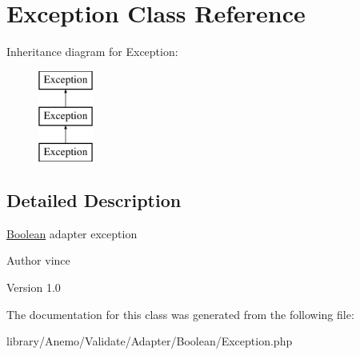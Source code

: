 \hypertarget{class_anemo_1_1_validate_1_1_adapter_1_1_boolean_1_1_exception}{
\section{Exception Class Reference}
\label{class_anemo_1_1_validate_1_1_adapter_1_1_boolean_1_1_exception}
}
Inheritance diagram for Exception:\begin{figure}[H]
\begin{center}
\leavevmode
\includegraphics[height=3.000000cm]{class_anemo_1_1_validate_1_1_adapter_1_1_boolean_1_1_exception}
\end{center}
\end{figure}


\subsection{Detailed Description}
\hyperlink{class_anemo_1_1_validate_1_1_adapter_1_1_boolean}{Boolean} adapter exception \begin{DoxyAuthor}{Author}
vince 
\end{DoxyAuthor}
\begin{DoxyVersion}{Version}
1.0 
\end{DoxyVersion}


The documentation for this class was generated from the following file:\begin{DoxyCompactItemize}
\item 
library/Anemo/Validate/Adapter/Boolean/Exception.php\end{DoxyCompactItemize}
